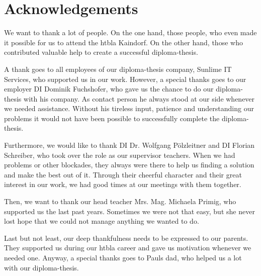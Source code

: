\chapter*{Acknowledgements}
We want to thank a lot of people. On the one hand, those people, who even made it possible for us to attend the \gls{htbla} Kaindorf. On the other hand, those who contributed valuable help to create a successful diploma-thesis.

A thank goes to all employees of our diploma-thesis company, Sunlime IT Services, who supported us in our work. However, a special thanks goes to our employer DI Dominik Fuchshofer, who gave us the chance to do our diploma-thesis with his company. As contact person he always stood at our side whenever we needed assistance. Without his tireless input, patience and understanding our problems it would not have been possible to successfully complete the diploma-thesis.

Furthermore, we would like to thank DI Dr. Wolfgang Pölzleitner and DI Florian Schreiber, who took over the role as our supervisor teachers. When we had problems or other blockades, they always were there to help us finding a solution and make the best out of it. Through their cheerful character and their great interest in our work, we had good times at our meetings with them together.

Then, we want to thank our head teacher Mrs. Mag. Michaela Primig, who supported us the last past years. Sometimes we were not that easy, but she never lost hope that we could not manage anything we wanted to do.

Last but not least, our deep thankfulness needs to be expressed to our parents. They supported us during our \gls{htbla} career and gave us motivation whenever we needed one. Anyway, a special thanks goes to Pauls dad, who helped us a lot with our diploma-thesis.

